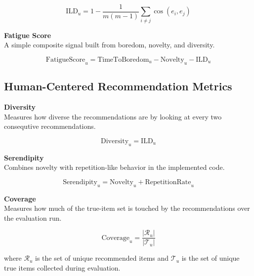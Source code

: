 \begin{equation}
    \mathrm{ILD}_u=1-\frac{1}{m(m-1)}\sum_{i\neq j}\cos(e_i,e_j)
\end{equation}


\noindent \textbf{Fatigue Score} \\
A simple composite signal built from boredom, novelty, and diversity.

\begin{equation}
    \mathrm{FatigueScore}_u=\mathrm{TimeToBoredom}_u-\mathrm{Novelty}_u-\mathrm{ILD}_u
\end{equation}



\subsection{Human-Centered Recommendation Metrics}


\noindent \textbf{Diversity} \\
Measures how diverse the recommendations are by looking at every two consequtive recommendations.

\begin{equation}
    \mathrm{Diversity}_u=\mathrm{ILD}_u
\end{equation}


\noindent \textbf{Serendipity} \\
Combines novelty with repetition-like behavior in the implemented code.

\begin{equation}
    \mathrm{Serendipity}_u=\mathrm{Novelty}_u+\mathrm{RepetitionRate}_u
\end{equation}


\noindent \textbf{Coverage} \\
Measures how much of the true-item set is touched by the recommendations over the evaluation run.

\begin{equation}
    \mathrm{Coverage}_u=\frac{|\mathcal{R}_u|}{|\mathcal{T}_u|}
\end{equation}

where $\mathcal{R}_u$ is the set of unique recommended items and $\mathcal{T}_u$ is the set of unique true items collected during evaluation. 



